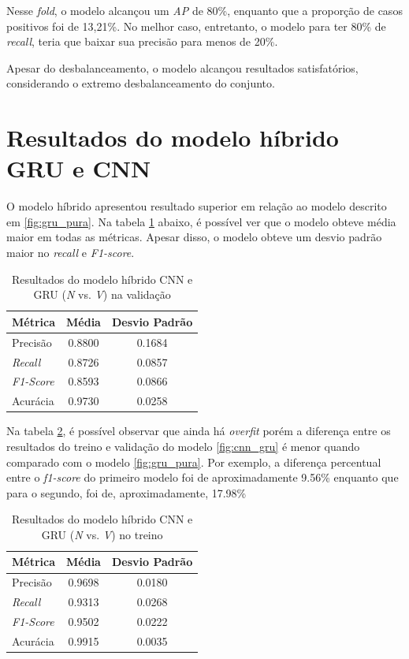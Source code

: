 \documentclass[
    12pt,                %
    openright,           %
    oneside,             %
    a4paper,             %
    brazil               %
]{abntex2}
\begin{document}
Nesse \textit{fold}, o modelo alcançou um \textit{AP} de 80\%, enquanto que a proporção de casos positivos foi de 13,21\%. No melhor caso, 
entretanto, o modelo para ter 80\% de \textit{recall}, teria que baixar sua precisão para menos de 20\%. 

Apesar do desbalanceamento, o modelo alcançou resultados satisfatórios, considerando o extremo desbalanceamento do conjunto.

\section{Resultados do modelo híbrido GRU e CNN}

O modelo híbrido apresentou resultado superior em relação ao modelo descrito em \ref{fig:gru_pura}. Na tabela \ref{tab:resultado_cv_gru_cnn_validacao}
abaixo, é possível ver que o modelo obteve média maior em todas as métricas. Apesar disso, o modelo obteve um desvio padrão maior 
no \textit{recall} e \textit{F1-score}. 

\begin{table}[H]
\centering
\caption{Resultados do modelo híbrido CNN e GRU (\textit{N} vs. \textit{V}) na validação}
\label{tab:resultado_cv_gru_cnn_validacao}
\begin{tabular}{lcc}
\hline
\textbf{Métrica} & \textbf{Média} & \textbf{Desvio Padrão} \\
\hline
Precisão & 0.8800 &  0.1684 \\
\textit{Recall} & 0.8726  & 0.0857 \\
\textit{F1-Score} & 0.8593 & 0.0866 \\
Acurácia & 0.9730 & 0.0258 \\
\hline
\end{tabular}
\end{table}

Na tabela  \ref{tab:resultado_cv_gru_cnn_treino}, é possível observar que ainda há \textit{overfit} porém a diferença entre os resultados
do treino e validação do modelo \ref{fig:cnn_gru} é menor quando comparado com o modelo \ref{fig:gru_pura}. Por exemplo, a 
diferença percentual entre o \textit{f1-score} do primeiro modelo foi de aproximadamente 9.56\% enquanto que para o segundo, foi de, aproximadamente, 17.98\%

\begin{table}[H]
\centering
\caption{Resultados do modelo híbrido CNN e GRU (\textit{N} vs. \textit{V}) no treino}
\label{tab:resultado_cv_gru_cnn_treino}
\begin{tabular}{lcc}
\hline
\textbf{Métrica} & \textbf{Média} & \textbf{Desvio Padrão} \\
\hline
Precisão & 0.9698 &  0.0180 \\
\textit{Recall} & 0.9313  & 0.0268 \\
\textit{F1-Score} & 0.9502 & 0.0222\\
Acurácia & 0.9915 & 0.0035 \\
\hline
\end{tabular}
\end{table}
\end{document}
